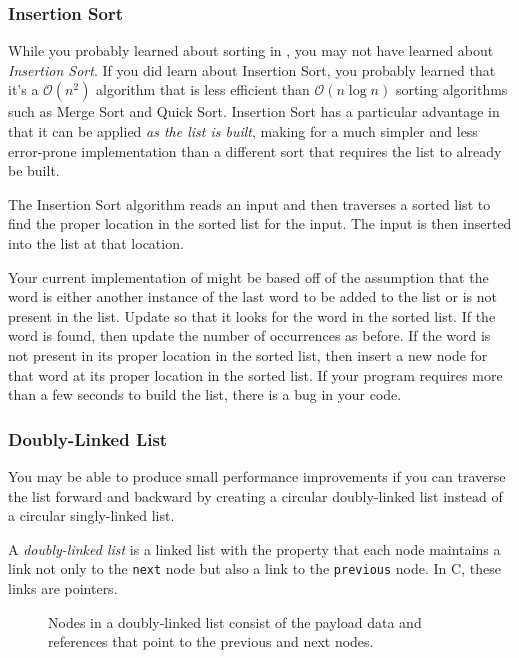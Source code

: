 \subsubsection{Insertion Sort}\label{subsec:insertionsort}

While you probably learned about sorting in \cstwo, you may not have learned about \textit{Insertion Sort}.
If you did learn about Insertion Sort, you probably learned that it's a $\mathcal{O}(n^2)$ algorithm that is less efficient than $\mathcal{O}(n \log n)$ sorting algorithms such as Merge Sort and Quick Sort.
Insertion Sort has a particular advantage in that it can be applied \textit{as the list is built}, making for a much simpler and less error-prone implementation than a different sort that requires the list to already be built.

The Insertion Sort algorithm reads an input and then traverses a sorted list to find the proper location in the sorted list for the input.
The input is then inserted into the list at that location.

Your current implementation of  might be based off of the assumption that the word is either another instance of the last word to be added to the list or is not present in the list.
Update  so that it looks for the word in the sorted list.
If the word is found, then update the number of occurrences as before.
If the word is not present in its proper location in the sorted list, then insert a new node for that word at its proper location in the sorted list.
If your program requires more than a few seconds to build the list, there is a bug in your code.

\subsubsection{Doubly-Linked List} \label{subsec:doublylinkedlist}

You may be able to produce small performance improvements if you can traverse the list forward and backward by creating a circular doubly-linked list instead of a circular singly-linked list.

A \textit{doubly-linked list} is a linked list with the property that each node maintains a link not only to the \lstinline{next} node but also a link to the \lstinline{previous} node.
In C, these links are pointers.

\begin{figure}[h]
    \centering
    \caption{Nodes in a doubly-linked list consist of the payload data and references that point to the previous and next nodes.}\label{fig:doubly-linked-list}
\end{figure}

